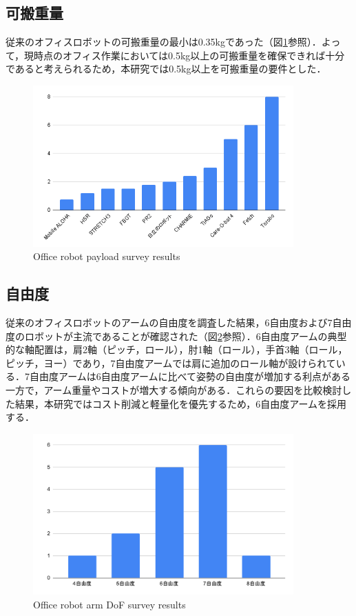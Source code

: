 \subsection{可搬重量}
従来のオフィスロボットの可搬重量の最小は0.35kgであった（図\ref{fig:payload}参照）．よって，現時点のオフィス作業においては0.5kg以上の可搬重量を確保できれば十分であると考えられるため，本研究では0.5kg以上を可搬重量の要件とした．
\begin{figure}
  \centering
  \includegraphics[width=10cm]{images/2syou/payload.png}
  \caption{Office robot payload survey results}
  \label{fig:payload}
\end{figure}
\clearpage

\subsection{自由度}
従来のオフィスロボットのアームの自由度を調査した結果，6自由度および7自由度のロボットが主流であることが確認された（図\ref{fig:armDof}参照）．6自由度アームの典型的な軸配置は，肩2軸（ピッチ，ロール），肘1軸（ロール），手首3軸（ロール，ピッチ，ヨー）であり，7自由度アームでは肩に追加のロール軸が設けられている．7自由度アームは6自由度アームに比べて姿勢の自由度が増加する利点がある一方で，アーム重量やコストが増大する傾向がある．これらの要因を比較検討した結果，本研究ではコスト削減と軽量化を優先するため，6自由度アームを採用する．
\begin{figure}[h]
  \centering
  \includegraphics[width=10cm]{images/2syou/armDof.pdf}
  \caption{Office robot arm DoF survey results}
  \label{fig:armDof}
\end{figure}
\clearpage


